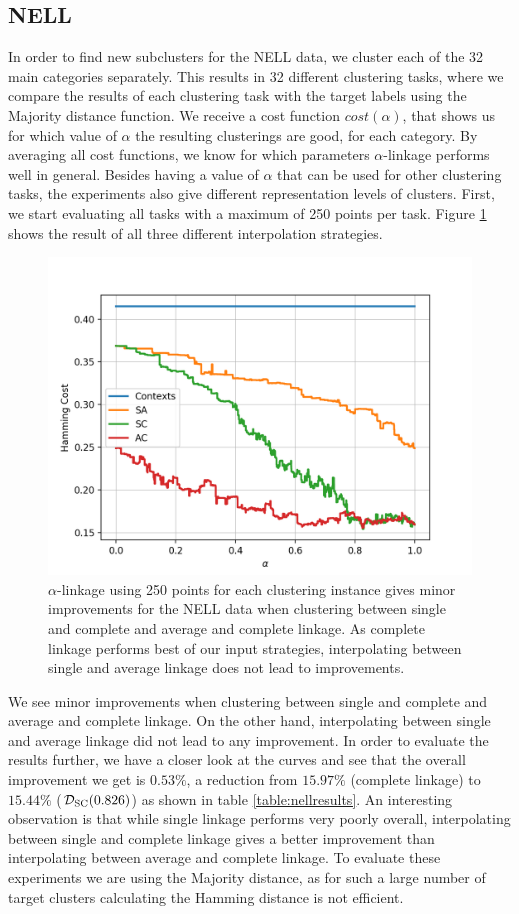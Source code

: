 \subsection{NELL}

In order to find new subclusters for the NELL data, we cluster each of the 32 main categories separately. This results in 32 different clustering tasks, where we compare the results of each clustering task with the target labels using the Majority distance function. We receive a cost function $cost(\alpha)$, that shows us for which value of $\alpha$ the resulting clusterings are good, for each category. By averaging all cost functions, we know for which parameters $\alpha$-linkage performs well in general. Besides having a value of $\alpha$ that can be used for other clustering tasks, the experiments also give different representation levels of clusters. First, we start evaluating all tasks with a maximum of 250 points per task. Figure \ref{fig:nellresults} shows the result of all three different interpolation strategies.

\begin{figure}[h]
\centering
  \includegraphics[width=.5\linewidth]{plots/nell_250}
\caption{$\alpha$-linkage using 250 points for each clustering instance gives minor improvements for the NELL data when clustering between single and complete and average and complete linkage. As complete linkage performs best of our input strategies, interpolating between single and average linkage does not lead to improvements.}
\label{fig:nellresults}
\end{figure}

We see minor improvements when clustering between single and complete and average and complete linkage. On the other hand, interpolating between single and average linkage did not lead to any improvement. In order to evaluate the results further, we have a closer look at the curves and see that the overall improvement we get is $0.53\%$, a reduction from $15.97\%$ (complete linkage) to $15.44\%$ ($\mathcal{D}_\text{SC}(0.826)$) as shown in table \ref{table:nellresults}. An interesting observation is that while single linkage performs very poorly overall, interpolating between single and complete linkage gives a better improvement than interpolating between average and complete linkage. To evaluate these experiments we are using the Majority distance, as for such a large number of target clusters calculating the Hamming distance is not efficient. 

